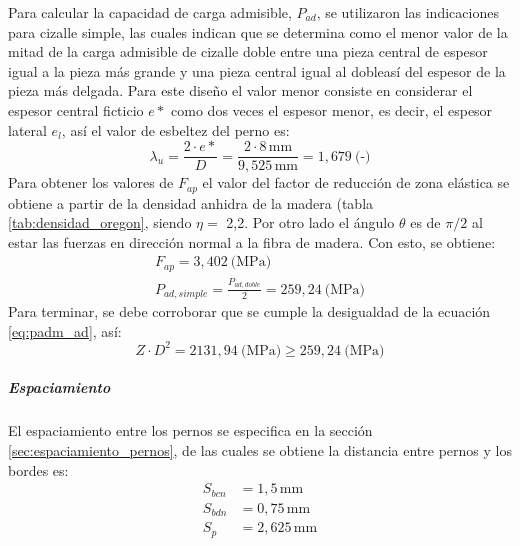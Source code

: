 Para calcular la capacidad de carga admisible, $P_{ad}$, se utilizaron las indicaciones para cizalle simple, las cuales indican que se determina como el menor valor de la mitad de la carga admisible de cizalle doble entre una pieza central de espesor igual a la pieza más grande y una pieza central igual al dobleasí  del espesor de la pieza más delgada. Para este diseño el valor menor consiste en considerar el espesor central ficticio $e*$ como dos veces el espesor menor, es decir, el espesor lateral $e_l$, así el valor de esbeltez del perno es:  
\begin{equation*}
	\lambda_u = \frac{2\cdot e*}{D} = \frac{2\cdot 8\, \text{mm}}{9,525\, \text{mm}} = 1,679\: \text{(-)}
\end{equation*}
Para obtener los valores de $F_{ap}$ el valor del factor de reducción de zona elástica se obtiene a partir de la densidad anhidra de la madera (tabla \ref{tab:densidad_oregon}, siendo $\eta =$ 2,2. Por otro lado el ángulo $\theta$ es de $\pi/2$ al estar las fuerzas en dirección normal a la fibra de madera. Con esto, se obtiene:
\begin{gather}
	F_{ap} = 3,402 \: \text{(MPa)} \\
	P_{ad,simple} =\frac{P_{ad,doble}}{2} = 259,24 \: \text{(MPa)}
\end{gather}
Para terminar, se debe corroborar que se cumple la desigualdad de la ecuación \ref{eq:padm_ad}, así:
\begin{equation*}
	Z\cdot D^2 = 2131,94 \: \text{(MPa)} \geq 259,24 \: \text{(MPa)}
\end{equation*}

\subparagraph{Espaciamiento}
El espaciamiento entre los pernos se especifica en la sección \ref{sec:espaciamiento_pernos}, de las cuales se obtiene la distancia entre pernos y los bordes es:
\begin{align*}
	S_{bcn} &= 1,5 \, \text{mm} \\
	S_{bdn} &= 0,75 \, \text{mm} \\
	S_p &= 2,625 \, \text{mm}
\end{align*}



